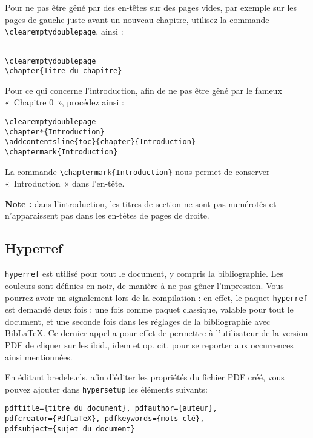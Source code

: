 \documentclass[10pt,a4paper]{article}
\begin{document}
Pour ne pas être gêné par des en-têtes sur des pages vides, par exemple sur les pages de gauche juste avant un nouveau chapitre, utilisez la commande \verb!\clearemptydoublepage!, ainsi :

\begin{Verbatim}[frame=single, framerule=0.2mm, rulecolor=\color{gray}, label=clearemptydoublepage]

\clearemptydoublepage
\chapter{Titre du chapitre}
\end{Verbatim}

Pour ce qui concerne l'introduction, afin de ne pas être gêné par le fameux «~Chapitre 0~», procédez ainsi :


\begin{Verbatim}[frame=single, framerule=0.2mm, rulecolor=\color{gray}, label=Pour l'intro]
\clearemptydoublepage
\chapter*{Introduction}
\addcontentsline{toc}{chapter}{Introduction}
\chaptermark{Introduction}
\end{Verbatim}

La commande \verb!\chaptermark{Introduction}! nous permet de conserver «~Introduction~» dans l'en-tête.

\textbf{Note :} dans l'introduction, les titres de section ne sont pas numérotés et n'apparaissent pas dans les en-têtes de pages de droite.


\subsection{Hyperref}
\verb!hyperref! est utilisé pour tout le document, y compris la bibliographie. Les couleurs sont définies en noir, de manière à ne pas g\^ener l'impression. Vous pourrez avoir un signalement lors de la compilation : en effet, le paquet \verb!hyperref! est demandé deux fois : une fois comme paquet classique, valable pour tout le document, et une seconde fois dans les réglages de la bibliographie avec BibLaTeX. Ce dernier appel a pour effet de permettre à l'utilisateur de la version PDF de cliquer sur les ibid., idem et op. cit. pour se reporter aux occurrences ainsi mentionnées.

En éditant bredele.cls, afin d'éditer les propriétés du fichier PDF créé, vous pouvez ajouter dans \verb!hypersetup! les éléments suivants: 
\begin{Verbatim}[frame=single, framerule=0.2mm, rulecolor=\color{gray}]
pdftitle={titre du document}, pdfauthor={auteur},
pdfcreator={PdfLaTeX}, pdfkeywords={mots-clé},
pdfsubject={sujet du document}
\end{Verbatim}
\end{document}
